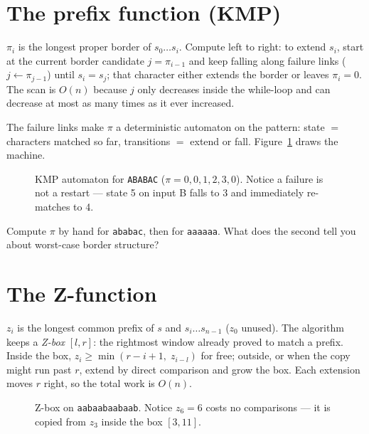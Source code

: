 \section{The prefix function (KMP)}\label{sec:kmp}
$\pi_i$ is the longest proper border of $s_0\dots s_i$. Compute
left to right: to extend $s_i$, start at the current border
candidate $j = \pi_{i-1}$ and keep falling along failure links
($j \leftarrow \pi_{j-1}$) until $s_i = s_j$; that character either
extends the border or leaves $\pi_i = 0$. The scan is $O(n)$
because $j$ only decreases inside the while-loop and can decrease
at most as many times as it ever increased.

The failure links make $\pi$ a deterministic automaton on the
pattern: state $=$ characters matched so far, transitions $=$
extend or fall. Figure~\ref{fig:kmpauto} draws the machine.
\begin{figure}[ht]\centering

\caption{KMP automaton for \texttt{ABABAC} ($\pi =
0,0,1,2,3,0$). Notice a failure is not a restart --- state 5 on
input B falls to 3 and immediately re-matches to 4.}
\label{fig:kmpauto}
\end{figure}
\begin{exercise}[easy]\label{exr:pihand}
Compute $\pi$ by hand for \texttt{ababac}, then for
\texttt{aaaaaa}. What does the second tell you about worst-case
border structure?
\end{exercise}

\section{The Z-function}\label{sec:z}
$z_i$ is the longest common prefix of $s$ and $s_i\dots s_{n-1}$
($z_0$ unused). The algorithm keeps a \emph{Z-box} $[l,r]$: the
rightmost window already proved to match a prefix. Inside the box,
$z_i \ge \min(r-i+1,\; z_{i-l})$ for free; outside, or when the
copy might run past $r$, extend by direct comparison and grow the
box. Each extension moves $r$ right, so the total work is $O(n)$.

\begin{figure}[ht]\centering

\caption{Z-box on \texttt{aabaabaabaab}. Notice $z_6 = 6$ costs no
comparisons --- it is copied from $z_3$ inside the box $[3,11]$.}
\label{fig:zbox}
\end{figure}

